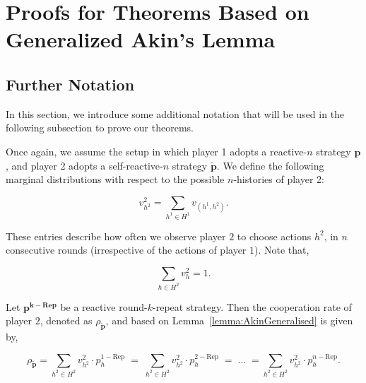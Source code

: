 \documentclass[11pt]{article}
\theoremstyle{plainCl1}
\theoremstyle{plainCl2}
\begin{document}

\section{Proofs for Theorems Based on Generalized Akin's Lemma}\label{appendix:proofs_for_theorems_generalized_akin}


\subsection{Further Notation}

In this section, we introduce some additional notation that will be used in the
following subsection to prove our theorems.

Once again, we assume the setup in which player 1 adopts a reactive-$n$ strategy
$\mathbf{p}$, and player 2 adopts a self-reactive-$n$ strategy
$\mathbf{\tilde{p}}$. We define the following marginal distributions with respect
to the possible $n$-histories of player 2:

\begin{equation}\label{Eq:marginal_distributions}
\displaystyle v^2_{h^2} = \sum_{h^1\in H^1} v_{(h^1, h^2)}.
\end{equation}

These entries describe how often we observe player $2$ to choose actions $h^2$,
in $n$ consecutive rounds (irrespective of the actions of player $1$). Note
that,

\begin{equation}\label{eq:normalization_marginal_distributions}
  \displaystyle \sum_{h \in H^2} v^2_{h} = 1.
\end{equation}

Let $\mathbf{p^{k - \text{Rep}}}$ be a reactive round-$k$-repeat strategy. Then
the cooperation rate of player $2$, denoted as $\rho_\mathbf{\tilde{p}}$, and based
on Lemma~\ref{lemma:AkinGeneralised} is given by,

\begin{equation}\label{Eq:coplayer_cooperation_expr}
  \rho_\mathbf{\tilde{p}} = \sum_{h^2 \in H^{2}} v^{2}_{h^2} \cdot p^{1 - \text{Rep}}_{h} \; = \; \sum_{h^2 \in H^{2}} v^{2}_{h^2} \cdot p^{2 - \text{Rep}}_{h} \; = \; \dots \; = \sum_{h^2 \in H^{2}} v^{2}_{h^2} \cdot p^{n - \text{Rep}}_{h}.
\end{equation}
\end{document}

